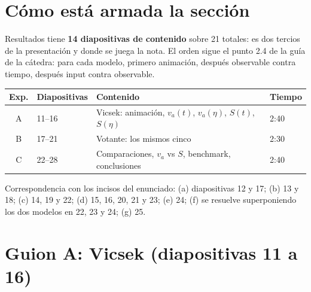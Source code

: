 \documentclass[11pt]{article}
\begin{document}

\tableofcontents
\clearpage

\section{Cómo está armada la sección}

Resultados tiene \textbf{14 diapositivas de contenido} sobre 21 totales: es
dos tercios de la presentación y donde se juega la nota. El orden sigue el punto
2.4 de la guía de la cátedra: para cada modelo, primero animación, después
observable contra tiempo, después input contra observable.

\begin{center}
\begin{tabular}{clll}
\toprule
Exp. & Diapositivas & Contenido & Tiempo \\
\midrule
A & 11--16 & Vicsek: animación, $v_a(t)$, $v_a(\eta)$, $S(t)$, $S(\eta)$ & 2:40 \\
B & 17--21 & Votante: los mismos cinco & 2:30 \\
C & 22--28 & Comparaciones, $v_a$ vs $S$, benchmark, conclusiones & 2:40 \\
\bottomrule
\end{tabular}
\end{center}

Correspondencia con los incisos del enunciado: (a) diapositivas 12 y 17;
(b) 13 y 18; (c) 14, 19 y 22; (d) 15, 16, 20, 21 y 23; (e) 24; (f) se resuelve
superponiendo los dos modelos en 22, 23 y 24; (g) 25.


\section{Guion A: Vicsek (diapositivas 11 a 16)}

\end{document}
